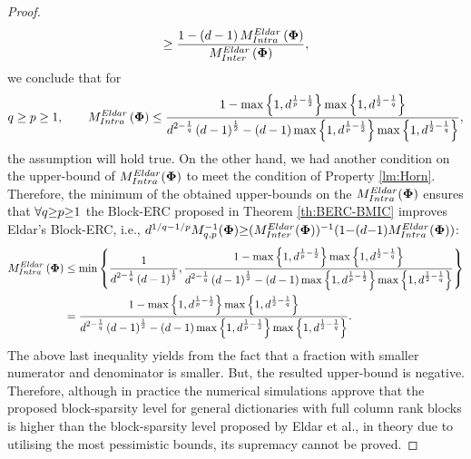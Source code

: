 \begin{proof}
\begin{gather*}
\geq \frac{1 - \left( d - 1 \right) M^{Eldar}_{Intra}\left( \boldsymbol{\Phi} \right)}{M^{Eldar}_{Inter}\left( \boldsymbol{\Phi} \right)},
\end{gather*}
we conclude that for
\begin{gather*}
q \geq p \geq 1, \qquad
M^{Eldar}_{Intra}\left( \boldsymbol{\Phi} \right) \leq 
\frac{1 - \max \left\lbrace 1 , d^{\frac1p - \frac12} \right\rbrace \max \left\lbrace 1 , d^{\frac12 - \frac1q} \right\rbrace}{d^{2 - \frac1q} \left( d - 1 \right)^\frac12 - \left( d - 1 \right) \max \left\lbrace 1 , d^{\frac1p - \frac12} \right\rbrace \max \left\lbrace 1 , d^{\frac12 - \frac1q} \right\rbrace},
\end{gather*}
the assumption will hold true.
On the other hand, we had another condition on the upper-bound of $M^{Eldar}_{Intra}(\boldsymbol{\Phi})$ to meet the condition of Property \ref{lm:Horn}.
Therefore, the minimum of the obtained upper-bounds on the $M^{Eldar}_{Intra}(\boldsymbol{\Phi})$ ensures that $\forall q {\geq} p {\geq} 1$ the Block-ERC proposed in Theorem \ref{th:BERC-BMIC} improves Eldar's Block-ERC, i.e., $d^{1/q {-} 1/p} M_{q,p}^{-1}(\boldsymbol{\Phi}) {\geq} (M^{Eldar}_{Inter}(\boldsymbol{\Phi}))^{-1} (1 {-} (d {-} 1)M^{Eldar}_{Intra}(\boldsymbol{\Phi}))$:
\begin{gather*}
\begin{aligned}
M^{Eldar}_{Intra}\left( \boldsymbol{\Phi} \right) &\leq 
\min \left\lbrace \frac{1}{d^{2 - \frac1q} \left( d - 1 \right)^\frac12} , \frac{1 - \max \left\lbrace 1 , d^{\frac1p - \frac12} \right\rbrace \max \left\lbrace 1 , d^{\frac12 - \frac1q} \right\rbrace}{d^{2 - \frac1q} \left( d - 1 \right)^\frac12 - \left( d - 1 \right) \max \left\lbrace 1 , d^{\frac1p - \frac12} \right\rbrace \max \left\lbrace 1 , d^{\frac12 - \frac1q} \right\rbrace} \right\rbrace \\
&= \frac{1 - \max \left\lbrace 1 , d^{\frac1p - \frac12} \right\rbrace \max \left\lbrace 1 , d^{\frac12 - \frac1q} \right\rbrace}{d^{2 - \frac1q} \left( d - 1 \right)^\frac12 - \left( d - 1 \right) \max \left\lbrace 1 , d^{\frac1p - \frac12} \right\rbrace \max \left\lbrace 1 , d^{\frac12 - \frac1q} \right\rbrace}.
\end{aligned}
\end{gather*}
The above last inequality yields from the fact that a fraction with smaller numerator and denominator is smaller.
But, the resulted upper-bound is negative.
Therefore, although in practice the numerical simulations approve that the proposed block-sparsity level for general dictionaries with full column rank blocks is higher than the block-sparsity level proposed by Eldar et al., in theory due to utilising the most pessimistic bounds, its supremacy cannot be proved.


\end{proof}
